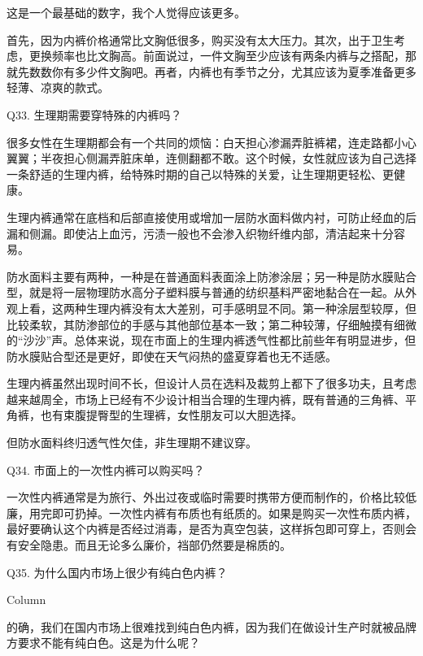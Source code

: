 \documentclass[12pt,UTF8]{ctexbook}
\begin{document}
这是一个最基础的数字，我个人觉得应该更多。

首先，因为内裤价格通常比文胸低很多，购买没有太大压力。其次，出于卫生考虑，更换频率也比文胸高。前面说过，一件文胸至少应该有两条内裤与之搭配，那就先数数你有多少件文胸吧。再者，内裤也有季节之分，尤其应该为夏季准备更多轻薄、凉爽的款式。





Q33. 生理期需要穿特殊的内裤吗？


很多女性在生理期都会有一个共同的烦恼：白天担心渗漏弄脏裤裙，连走路都小心翼翼；半夜担心侧漏弄脏床单，连侧翻都不敢。这个时候，女性就应该为自己选择一条舒适的生理内裤，给特殊时期的自己以特殊的关爱，让生理期更轻松、更健康。

生理内裤通常在底档和后部直接使用或增加一层防水面料做内衬，可防止经血的后漏和侧漏。即使沾上血污，污渍一般也不会渗入织物纤维内部，清洁起来十分容易。

防水面料主要有两种，一种是在普通面料表面涂上防渗涂层；另一种是防水膜贴合型，就是将一层物理防水高分子塑料膜与普通的纺织基料严密地黏合在一起。从外观上看，这两种生理内裤没有太大差别，可手感明显不同。第一种涂层型较厚，但比较柔软，其防渗部位的手感与其他部位基本一致；第二种较薄，仔细触摸有细微的“沙沙”声。总体来说，现在市面上的生理内裤透气性都比前些年有明显进步，但防水膜贴合型还是更好，即使在天气闷热的盛夏穿着也无不适感。

生理内裤虽然出现时间不长，但设计人员在选料及裁剪上都下了很多功夫，且考虑越来越周全，市场上已经有不少设计相当合理的生理内裤，既有普通的三角裤、平角裤，也有束腹提臀型的生理裤，女性朋友可以大胆选择。

但防水面料终归透气性欠佳，非生理期不建议穿。





Q34. 市面上的一次性内裤可以购买吗？


一次性内裤通常是为旅行、外出过夜或临时需要时携带方便而制作的，价格比较低廉，用完即可扔掉。一次性内裤有布质也有纸质的。如果是购买一次性布质内裤，最好要确认这个内裤是否经过消毒，是否为真空包装，这样拆包即可穿上，否则会有安全隐患。而且无论多么廉价，裆部仍然要是棉质的。





Q35. 为什么国内市场上很少有纯白色内裤？



Column

的确，我们在国内市场上很难找到纯白色内裤，因为我们在做设计生产时就被品牌方要求不能有纯白色。这是为什么呢？
\end{document}

